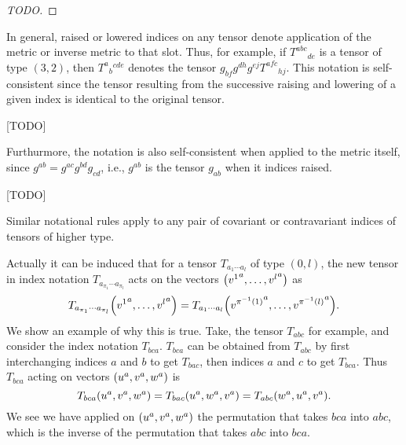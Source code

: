 \documentclass{note}
\numberwithin{equation}{chapter}
\begin{document}
\begin{proof}
    [TODO]
\end{proof}

\begin{quotebar}
    In general, raised or lowered indices on any tensor denote application of the
    metric or inverse metric to that slot. Thus, for example, if $T^{abc}{}_{de}$
    is a tensor of type $(3,2)$, then $T^a{}_b{}^{cde}$ denotes the tensor
    $g_{bf}g^{dh}g^{ej}T^{afc}{}_{hj}$. This notation is self-consistent since the
    tensor resulting from the successive raising and lowering of a given index is
    identical to the original tensor.
\end{quotebar}

[TODO]

\begin{quotebar}
    Furthurmore, the notation is also self-consistent when applied to the metric
    itself, since $g^{ab} = g^{ac}g^{bd}g_{cd}$, i.e., $g^{ab}$ is the tensor
    $g_{ab}$ when it indices raised.
\end{quotebar}

[TODO]

\begin{quotebar}
    Similar notational rules apply to any pair of covariant or contravariant
    indices of tensors of higher type.
\end{quotebar}

Actually it can be induced that for a tensor $T_{a_1\cdots a_l}$ of type $(0,
    l)$, the new tensor in index notation $T_{a_{\pi_1}\cdots a_{\pi_l}}$ acts on
the vectors $\prn{{v^1}^a, \dots, {v^l}^a}$ as
\begin{equation*}
    T_{a_{\pi_1}\cdots a_{\pi_l}} \prn{{v^1}^a, \dots, {v^l}^a} = T_{a_1\cdots a_l}
    \prn{{v^{\pi^{-1}(1)}}^a, \dots, {v^{\pi^{-1}(l)}}^a}.
\end{equation*}
We show an example of why this is true. Take, the tensor $T_{abc}$ for example,
and consider the index notation $T_{bca}$. $T_{bca}$ can be obtained from
$T_{abc}$ by first interchanging indices $a$ and $b$ to get $T_{bac}$, then
indices $a$ and $c$ to get $T_{bca}$. Thus $T_{bca}$ acting on vectors
$\prn{u^a, v^a, w^a}$ is
\begin{equation*}
    T_{bca} \prn{u^a, v^a, w^a} = T_{bac} \prn{u^a, w^a, v^a} = T_{abc} \prn{w^a,
        u^a, v^a}.
\end{equation*}
We see we have applied on $\prn{u^a, v^a, w^a}$ the permutation that takes
$bca$ into $abc$, which is the inverse of the permutation that takes $abc$ into
$bca$.
\end{document}
